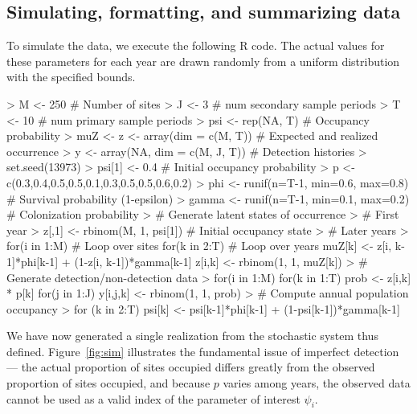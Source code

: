 \documentclass[12pt]{article}
\renewenvironment{Schunk}{\vspace{\topsep}}{\vspace{\topsep}}
\begin{document}
\subsection{Simulating, formatting, and summarizing data}
To simulate the data, we execute the following R code.
The actual values for these parameters for each year are drawn
randomly from a uniform distribution with
the specified bounds.


\begin{small}
\begin{Schunk}
\begin{Sinput}
> M <- 250                                # Number of sites
> J <- 3                                  # num secondary sample periods
> T <- 10                                 # num primary sample periods
> psi <- rep(NA, T)                       # Occupancy probability
> muZ <- z <- array(dim = c(M, T))        # Expected and realized occurrence
> y <- array(NA, dim = c(M, J, T))        # Detection histories
> set.seed(13973)
> psi[1] <- 0.4                           # Initial occupancy probability
> p <- c(0.3,0.4,0.5,0.5,0.1,0.3,0.5,0.5,0.6,0.2)
> phi <- runif(n=T-1, min=0.6, max=0.8)   # Survival probability (1-epsilon)
> gamma <- runif(n=T-1, min=0.1, max=0.2) # Colonization probability
> # Generate latent states of occurrence
> # First year
> z[,1] <- rbinom(M, 1, psi[1])           # Initial occupancy state
> # Later years
> for(i in 1:M){                          # Loop over sites
    for(k in 2:T){                        # Loop over years
       muZ[k] <- z[i, k-1]*phi[k-1] + (1-z[i, k-1])*gamma[k-1]
       z[i,k] <- rbinom(1, 1, muZ[k])
    }
 }
> # Generate detection/non-detection data
> for(i in 1:M){
    for(k in 1:T){
       prob <- z[i,k] * p[k]
       for(j in 1:J){
          y[i,j,k] <- rbinom(1, 1, prob)
       }
    }
 }
> # Compute annual population occupancy
> for (k in 2:T){
    psi[k] <- psi[k-1]*phi[k-1] + (1-psi[k-1])*gamma[k-1]
    }
\end{Sinput}
\end{Schunk}
\end{small}


We have now generated a single realization from the stochastic system
thus defined. Figure~\ref{fig:sim}
illustrates the fundamental issue
of imperfect detection --- the actual proportion of sites occupied
differs greatly from the observed proportion of sites occupied, and
because $p$ varies  among years, the observed data cannot be used as a
valid index of the parameter of interest $\psi_i$.
\end{document}
